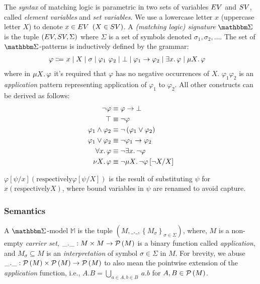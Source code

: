 The \emph{syntax} of matching logic is parametric in two sets of variables
$EV$ and $SV$, called \emph{element variables} and \emph{set variables}. We use
a lowercase letter $x$ (uppercase letter $X$) to denote $x \in EV$ $(X \in SV)$.
A \emph{(matching logic) signature} $\MLSigma$ is the tuple $\left(EV,SV, \Sigma\right)$
where $\Sigma$ is a set of symbols denoted $\sigma_1,\sigma_2,\dots$.
The set of $\MLSigma$-patterns is inductively defined by the grammar:
\begin{align}
\varphi \Coloneqq\
& x
\mid X
\mid \sigma
\mid \varphi_1 \  \varphi_2
\mid \bot
\mid \varphi_1 \imp \varphi_2
\mid \exists x \ld \varphi
\mid \mu X \ld \varphi %
\end{align}
where in $\mu X \mathord{.\,} \varphi$ it's required that $\varphi$ has no negative occurrences of $X$.
$\varphi_1\varphi_2$ is an \emph{application} pattern representing application
  of $\varphi_1$ to $\varphi_2$. All other constructs can be derived as follows:
\begin{align}
  \neg \varphi &\equiv \varphi \to \bot \\
  \top &\equiv \neg \varphi  \\
  \varphi_1 \wedge \varphi_2 & \equiv \neg \left(\varphi_1 \vee \varphi_2 \right) \\
  \varphi_1 \vee \varphi_2 &\equiv \neg\varphi_1 \to \varphi_2 \\
  \forall x \mathord{.\,} \varphi &\equiv \neg\exists x \mathord{.\,} \neg\varphi \\
  \nu X\mathord{.\,}\varphi &\equiv \neg \mu X \mathord{.\,}\neg\varphi\left[\neg X / X\right]
\end{align}

$\varphi\left[\psi / x\right] (\text{respectively} \varphi\left[\psi / X\right])$ is the result of
substituting $\psi$ for $x (\text{respectively} X)$, where bound variables in
$\psi$ are renamed to avoid capture.

\subsubsection{Semantics}

A $\MLSigma$-model $\mathbb{M}$ is the tuple $\left(M, \_.\_,
\left\{M_{\sigma}\right\}_{\sigma \in \Sigma}\right)$, where,
$M$ is a non-empty \emph{carrier set}, $\_.\_: M \times M \to \mathcal{P}\left(M\right)$
is a binary function called \emph{application}, and $M_{\sigma} \subseteq M$ is an
\emph{interpretation} of symbol $\sigma \in \Sigma$ in $M$. For brevity, we
abuse  $\_.\_: \mathcal{P}\left(M\right) \times \mathcal{P}\left(M\right) \to \mathcal{P}\left(M\right)$ to also mean the pointwise extension of
the \emph{application} function, i.e., $A . B = \bigcup_{a \in A, b \in B}\ a.b$
for $A,B \in \mathcal{P}\left(M\right)$.

